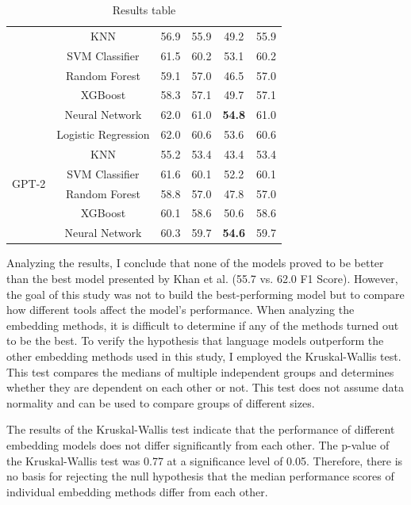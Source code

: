 \begin{table}[htb]
\begin{tabular}{l|c|c|c|c|c}
    & KNN & 56.9 & 55.9 & 49.2 & 55.9 \\
    & SVM Classifier & 61.5 & 60.2 & 53.1 & 60.2 \\
    & Random Forest & 59.1 & 57.0 & 46.5 & 57.0 \\
    & XGBoost & 58.3 & 57.1 & 49.7 & 57.1 \\
    & Neural Network & 62.0 & 61.0 & \textbf{54.8} & 61.0 \\
\hline
\multirow{6}{*}{GPT-2} 
    & Logistic Regression & 62.0 & 60.6 & 53.6 & 60.6 \\
    & KNN & 55.2 & 53.4 & 43.4 & 53.4 \\
    & SVM Classifier & 61.6 & 60.1 & 52.2 & 60.1 \\
    & Random Forest & 58.8 & 57.0 & 47.8 & 57.0 \\
    & XGBoost &  60.1 & 58.6 & 50.6 & 58.6 \\
    & Neural Network & 60.3 & 59.7 & \textbf{54.6} & 59.7 \\
\hline
\end{tabular}
\caption{Results table}
\label{results_table}
\end{table}

Analyzing the results, I conclude that none of the models proved to be better than the best model presented by Khan et al. (55.7 vs. 62.0 F1 Score). However, the goal of this study was not to build the best-performing model but to compare how different tools affect the model's performance. When analyzing the embedding methods, it is difficult to determine if any of the methods turned out to be the best. To verify the hypothesis that language models outperform the other embedding methods used in this study, I employed the Kruskal-Wallis test. This test compares the medians of multiple independent groups and determines whether they are dependent on each other or not. This test does not assume data normality and can be used to compare groups of different sizes.

The results of the Kruskal-Wallis test indicate that the performance of different embedding models does not differ significantly from each other. The p-value of the Kruskal-Wallis test was 0.77 at a significance level of 0.05. Therefore, there is no basis for rejecting the null hypothesis that the median performance scores of individual embedding methods differ from each other.

